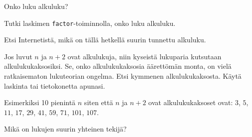 \begin{kotitehtavasivu}
\begin{tehtava}
    Onko luku
    alkuluku?
    
    \begin{vastaus}
    \end{vastaus}
    
\end{tehtava}

\begin{tehtava}
    Tutki laskimen {\tt factor}-toiminnolla, onko luku
    alkuluku.

    \begin{vastaus}
    \end{vastaus}
    
\end{tehtava}

\begin{tehtava}
    Etsi Internetistä, mikä on tällä hetkellä suurin tunnettu alkuluku.
\end{tehtava}

\begin{tehtava}
    Jos luvut $n$ ja $n + 2$ ovat alkulukuja, niin kyseistä lukuparia kutsutaan alkulukukaksosiksi. Se, onko alkulukukaksosia äärettömän monta, on vielä ratkaisematon lukuteorian ongelma. Etsi kymmenen alkulukukaksosta. Käytä laskinta tai tietokonetta apunasi.
    
    \begin{vastaus}
        Esimerkiksi 10 pienintä $n$ siten että $n$ ja $n + 2$ ovat alkulukukaksoset ovat: $3$, $5$, $11$, $17$, $29$, $41$, $59$, $71$, $101$, $107$.
    \end{vastaus}
    
\end{tehtava}

\begin{tehtava}
    Mikä on lukujen suurin yhteinen tekijä?

    \begin{vastaus}
    \end{vastaus}
    

\end{tehtava}
\end{kotitehtavasivu}

